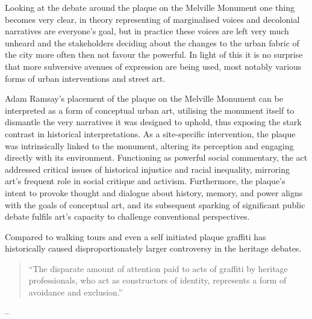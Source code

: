 \documentclass{scrartcl}
\renewcommand{\cite}{\parencite}
\begin{document}
Looking at the debate around the plaque on the Melville Monument one thing becomes very clear, in theory representing of marginalised voices and decolonial narratives are everyone's goal, but in practice these voices are left very much unheard and the stakeholders deciding about the changes to the urban fabric of the city more often then not favour the powerful. 
In light of this it is no surprise that more subversive avenues of expression are being used, most notably various forms of urban interventions and street art.

Adam Ramsay's placement of the plaque on the Melville Monument can be interpreted as a form of conceptual urban art, utilising the monument itself to dismantle the very narratives it was designed to uphold, thus exposing the stark contrast in historical interpretations. As a site-specific intervention, the plaque was intrinsically linked to the monument, altering its perception and engaging directly with its environment. Functioning as powerful social commentary, the act addressed critical issues of historical injustice and racial inequality, mirroring art's frequent role in social critique and activism. Furthermore, the plaque's intent to provoke thought and dialogue about history, memory, and power aligns with the goals of conceptual art, and its subsequent sparking of significant public debate fulfils art's capacity to challenge conventional perspectives.

Compared to walking tours and even a self initiated plaque graffiti has historically caused disproportionately larger controversy in the heritage debates. 

\begin{quotation}
``The disparate amount of attention paid to acts of graffiti by heritage professionals, who act as constructors of identity, represents a form of avoidance and exclusion.''
\end{quotation}
\begin{flushright}
-- \cite[][]{merrill_2011}
\end{flushright}
\end{document}
